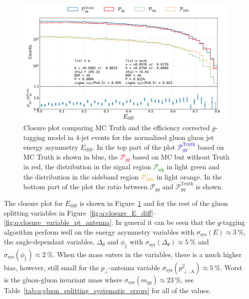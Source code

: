 \begin{figure}
  \centerfloat
  \includegraphics[width=0.99\textwidth, trim=10 0 20 5, clip, page=1]{figures/quarks/gtag-closure_test-down_sample=1.00-ML_vars=vertex-selection=b-ejet_min=4-n_iter_RS_lgb=99-n_iter_RS_xgb=9-cdot_cut=0.90-version=19-njet=4.pdf}
  \caption[Closure Plot Comparing MC Truth and the Efficiency Corrected $g$-Tagging Model in 4-Jet Events for the Normalized Gluon Gluon Jet Energy Asymmetry]
          {Closure plot comparing MC Truth and the efficiency corrected $g$-tagging model in 4-jet events for the normalized gluon gluon jet energy asymmetry $E_\mathrm{diff}$. In the top part of the plot \textcolor{blue}{$\mathcal{P}_{gg}^\mathrm{Truth}$} based on MC Truth is shown in blue, the \textcolor{red}{$\mathcal{P}_{gg}$} based on MC but without Truth in red, the distribution in the signal region \textcolor{green}{$\mathcal{P}_{\mathrm{sig}}$} in light green and the distribution in the sideband region \textcolor{orange}{$\mathcal{P}_{\mathrm{side}}$} in light orange. In the bottom part of the plot the ratio between $\mathcal{P}_{gg}$ and $\mathcal{P}_{gg}^\mathrm{Truth}$  is shown. 
          } 
  \label{fig:q:closure_E_diff_non_appendix}
\end{figure}

The closure plot for $E_\mathrm{diff}$ is shown in Figure~\ref{fig:q:closure_E_diff_non_appendix} and for the rest of the gluon splitting variables in Figure~\ref{fig:q:closure_E_diff}--\ref{fig:q:closure_variable_pt_antenna}. In general it can be seen that the $g$-tagging algorithm perform well on the energy asymmetry variables with $\sigma_\mathrm{sys}(E) \approx \SI{3}{\percent}$, the angle-dependant variables, $\Delta_\theta$ and $\phi_\parallel$ with $\sigma_\mathrm{sys}(\Delta_\theta) \approx \SI{5}{\percent}$ and $\sigma_\mathrm{sys}(\phi_\parallel) \approx \SI{2}{\percent}$. When the mass enters in the variables, there is a much higher bias, however, still small for the $p_\perp$-antenna variable $\sigma_\mathrm{sys}(p^2_{\perp,\mathrm{A}}) \approx \SI{5}{\percent}$. Worst is the gluon-gluon invariant mass where $\sigma_\mathrm{sys}(m_{gg}) \approx \SI{23}{\percent}$, see Table~\ref{tab:q:gluon_splitting_systematic_errors} for all of the values. 

